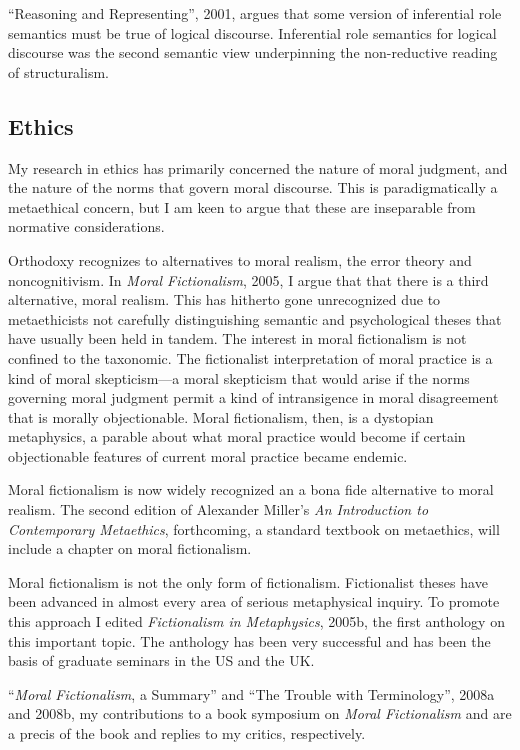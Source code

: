 \documentclass[contbibnum]{cv}
\begin{document}
``Reasoning and Representing'', 2001, argues that some version of inferential role semantics must be true of logical discourse. Inferential role semantics for logical discourse was the second semantic view underpinning the non-reductive reading of structuralism.


\subsection{Ethics}\label{sub:ethics} %

My research in ethics has primarily concerned the nature of moral judgment, and the nature of the norms that govern moral discourse. This is paradigmatically a metaethical concern, but I am keen to argue that these are inseparable from normative considerations.

Orthodoxy recognizes to alternatives to moral realism, the error theory and noncognitivism. In \emph{Moral Fictionalism}, 2005, I argue that that there is a third alternative, moral realism. This has hitherto gone unrecognized due to metaethicists not carefully distinguishing semantic and psychological theses that have usually been held in tandem. The interest in moral fictionalism is not confined to the taxonomic. The fictionalist interpretation of moral practice is a kind of moral skepticism---a moral skepticism that would arise if the norms governing moral judgment permit a kind of intransigence in moral disagreement that is morally objectionable. Moral fictionalism, then, is a dystopian metaphysics, a parable about what moral practice would become if certain objectionable features of current moral practice became endemic. 

Moral fictionalism is now widely recognized an a bona fide alternative to moral realism. The second edition of Alexander Miller's \emph{An Introduction to Contemporary Metaethics}, forthcoming, a standard textbook on metaethics, will include a chapter on moral fictionalism.

Moral fictionalism is not the only form of fictionalism. Fictionalist theses have been advanced in almost every area of serious metaphysical inquiry. To promote this approach I edited \emph{Fictionalism in Metaphysics}, 2005b, the first anthology on this important topic. The anthology has been very successful and has been the basis of graduate seminars in the US and the UK.

``\emph{Moral Fictionalism}, a Summary'' and ``The Trouble with Terminology'', 2008a and 2008b, my contributions to a book symposium on \emph{Moral Fictionalism} and are a precis of the book and replies to my critics, respectively.
\end{document}
